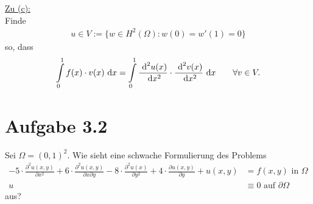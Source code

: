\documentclass[12pt,a4paper]{article}
\begin{document}
\begin{lösung}
\underline{Zu (c):}\\
Finde
\begin{align*}
u\in V:=\big\lbrace w\in H^2(\Omega):w(0)=w'(1)=0\big\rbrace
\end{align*}
so, dass
\begin{align*}
\int\limits_0^1 f(x)\cdot v(x)\text{ d} x=\int\limits_0^1\frac{\text{ d}^2 u(x)}{\text{ d} x^2}\cdot\frac{\text{ d}^2 v(x)}{\text{ d} x^2}\text{ d} x\qquad\forall v\in V.
\end{align*}
\end{lösung}

\section*{Aufgabe 3.2}
Sei $\Omega=(0,1)^2$. Wie sieht eine schwache Formulierung des Problems
\begin{align*}
-5\cdot\frac{\partial^2 u(x,y)}{\partial x^2}+6\cdot\frac{\partial^2 u(x,y)}{\partial x\partial y}-8\cdot\frac{\partial^2 u(x)}{\partial y^2}+4\cdot\frac{\partial u(x,y)}{\partial y}+u(x,y)&=f(x,y) \text{ in }\Omega\\
u&\equiv 0\text{ auf }\partial\Omega
\end{align*}
aus?
\end{document}
